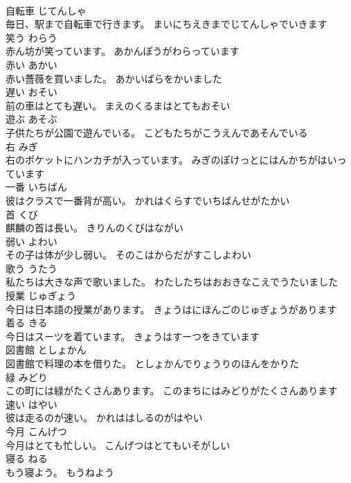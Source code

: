 \documentclass[8pt]{extreport}
\begin{document}
\begin{CJK}{UTF8}{min}
\\	自転車	じてんしゃ	
\\	毎日、駅まで自転車で行きます。	まいにちえきまでじてんしゃでいきます	
\\	笑う	わらう	
\\	赤ん坊が笑っています。	あかんぼうがわらっています	
\\	赤い	あかい	
\\	赤い薔薇を買いました。	あかいばらをかいました	
\\	遅い	おそい	
\\	前の車はとても遅い。	まえのくるまはとてもおそい	
\\	遊ぶ	あそぶ	
\\	子供たちが公園で遊んでいる。	こどもたちがこうえんであそんでいる	
\\	右	みぎ	
\\	右のポケットにハンカチが入っています。	みぎのぽけっとにはんかちがはいっています	
\\	一番	いちばん	
\\	彼はクラスで一番背が高い。	かれはくらすでいちばんせがたかい	
\\	首	くび	
\\	麒麟の首は長い。	きりんのくびはながい	
\\	弱い	よわい	
\\	その子は体が少し弱い。	そのこはからだがすこしよわい	
\\	歌う	うたう	
\\	私たちは大きな声で歌いました。	わたしたちはおおきなこえでうたいました	
\\	授業	じゅぎょう	
\\	今日は日本語の授業があります。	きょうはにほんごのじゅぎょうがあります	
\\	着る	きる	
\\	今日はスーツを着ています。	きょうはすーつをきています	
\\	図書館	としょかん	
\\	図書館で料理の本を借りた。	としょかんでりょうりのほんをかりた	
\\	緑	みどり	
\\	この町には緑がたくさんあります。	このまちにはみどりがたくさんあります	
\\	速い	はやい	
\\	彼は走るのが速い。	かれははしるのがはやい	
\\	今月	こんげつ	
\\	今月はとても忙しい。	こんげつはとてもいそがしい	
\\	寝る	ねる	
\\	もう寝よう。	もうねよう	

\end{CJK}
\end{document}
